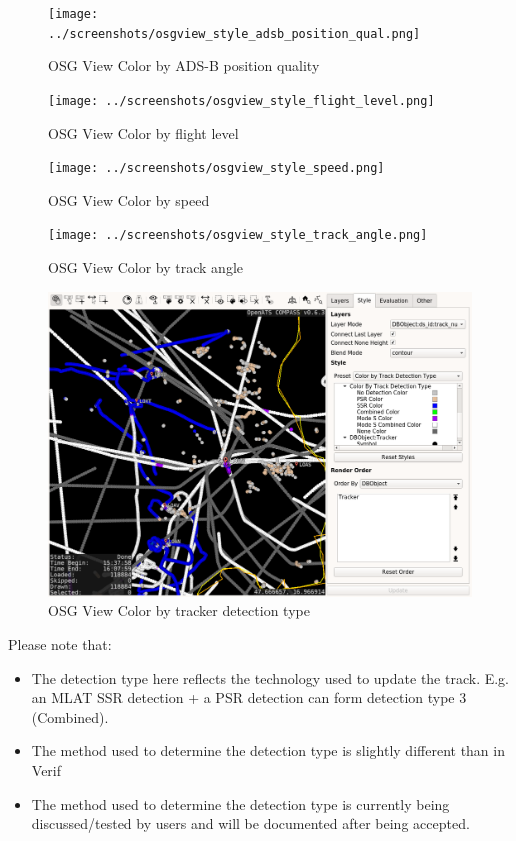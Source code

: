 \begin{figure}[H]
    \hspace*{-2.5cm}
    \texttt{[image: ../screenshots/osgview\_style\_adsb\_position\_qual.png]}
  \caption{OSG View Color by ADS-B position quality}
\end{figure}

\begin{figure}[H]
    \hspace*{-2.5cm}
    \texttt{[image: ../screenshots/osgview\_style\_flight\_level.png]}
  \caption{OSG View Color by flight level}
\end{figure}

\begin{figure}[H]
    \hspace*{-2.5cm}
    \texttt{[image: ../screenshots/osgview\_style\_speed.png]}
  \caption{OSG View Color by speed}
\end{figure}

\begin{figure}[H]
    \hspace*{-2.5cm}
    \texttt{[image: ../screenshots/osgview\_style\_track\_angle.png]}
  \caption{OSG View Color by track angle}
\end{figure}

\begin{figure}[H]
    \hspace*{-2.5cm}
    \includegraphics[width=19cm,frame]{../screenshots/osgview_style_tracker_detection_type.png}
  \caption{OSG View Color by tracker detection type}
\end{figure}

Please note that:
\begin{itemize}
 \item The detection type here reflects the technology used to update the track. E.g. an MLAT SSR detection + a PSR detection can form detection type 3 (Combined).
 \item The method used to determine the detection type is slightly different than in Verif
 \item The method used to determine the detection type is currently being discussed/tested by users and will be documented after being accepted.
\end{itemize}

